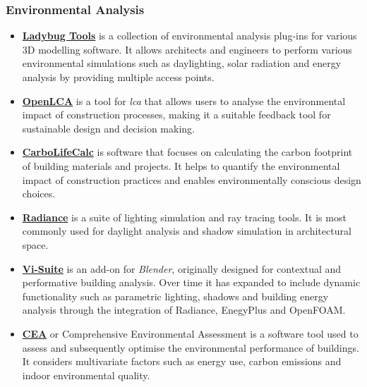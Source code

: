 \documentclass[a4paper, 12pt]{report}
\begin{document}
\subsubsection{Environmental Analysis}\label{subsec:environmental-analysis}

\begin{itemize}

\item \href{https://github.com/ladybug-tools}{\textbf{Ladybug Tools}} is a collection of environmental analysis plug-ins for various 3D modelling software. It allows architects and engineers to perform various environmental simulations such as daylighting, solar radiation and energy analysis by providing multiple access points.

\item \href{https://github.com/GreenDelta/olca-app}{\textbf{OpenLCA}} is a tool for \textit{\acrfull{lca}} that allows users to analyse the environmental impact of construction processes, making it a suitable feedback tool for sustainable design and decision making.

\item \href{https://github.com/DavidVeld/CarboLifeCalc}{\textbf{CarboLifeCalc}} is software that focuses on calculating the carbon footprint of building materials and projects. It helps to quantify the environmental impact of construction practices and enables environmentally conscious design choices.

\item \href{https://github.com/LBNL-ETA/Radiance/tree/master}{\textbf{Radiance}} is a suite of lighting simulation and ray tracing tools. It is most commonly used for daylight analysis and shadow simulation in architectural space.

\item \href{https://github.com/rgsouthall/vi-suite07}{\textbf{Vi-Suite}} is an add-on for \textit{Blender}, originally designed for contextual and performative building analysis. Over time it has expanded to include dynamic functionality such as parametric lighting, shadows and building energy analysis through the integration of Radiance, EnegyPlus and OpenFOAM.

\item \href{https://github.com/architecture-building-systems/CityEnergyAnalyst}{\textbf{CEA}} or Comprehensive Environmental Assessment is a software tool used to assess and subsequently optimise the environmental performance of buildings. It considers multivariate factors such as energy use, carbon emissions and indoor environmental quality.


\end{itemize}
\end{document}

